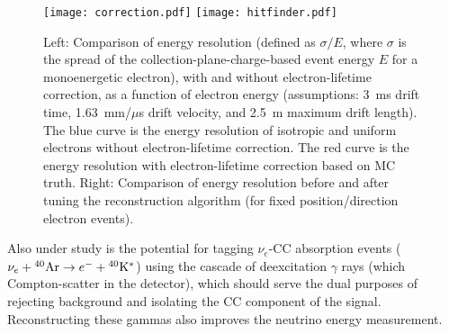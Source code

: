 %
\begin{figure}[!htb] %
 \centering
\texttt{[image: correction.pdf]} 
\texttt{[image: hitfinder.pdf]} 

 \caption[Comparisons of energy resolution]{Left: Comparison of energy
   resolution (defined as $\sigma/E$, where $\sigma$ is the spread of
   the collection-plane-charge-based event energy $E$ for a
   monoenergetic electron), with and without electron-lifetime
   correction, as a function of electron energy (assumptions: 3~ms drift time, 1.63~mm/$\mu$s drift velocity, and 2.5~m maximum drift length). The blue curve is the
   energy resolution of isotropic and uniform electrons without
   electron-lifetime correction. The red curve is the energy
   resolution with electron-lifetime correction based on MC truth.
   Right: Comparison of energy resolution before and after tuning the
   reconstruction algorithm (for fixed position/direction electron
   events).}\label{fig:lowe_res}
\end{figure}


Also under study is the potential for tagging $\nu_e$-CC absorption
events ($\nu_e +{}^{40}{\rm Ar} \rightarrow e^- +{}^{40}{\rm
  K^*}$) using the cascade of deexcitation $\gamma$ rays (which Compton-scatter in the detector), which should
serve the dual purposes of rejecting background and isolating the CC
component of the signal.  Reconstructing these gammas also improves the neutrino energy measurement. 



